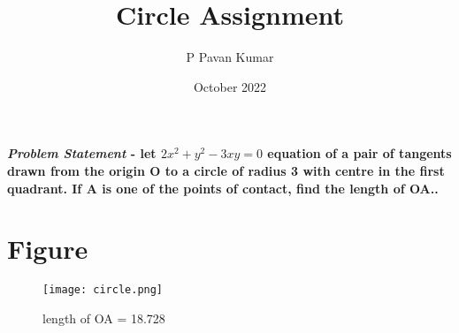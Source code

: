 \documentclass[journal,10pt,twocolumn]{article}
\title{\textbf{Circle Assignment}}
\author{P Pavan Kumar}
\date{October 2022}
\begin{document}
\maketitle
\paragraph{\textit{Problem Statement} - let $ 2x^2+y^2-3xy=0 $ equation of a pair of tangents drawn from the origin O to a circle of radius 3 with centre in the first quadrant. If A is one of the points of contact, find the length of OA..}

\section*{\large Figure}

\begin{figure}[H]
\centering
\texttt{[image: circle.png]}
\caption{length of OA = 18.728}
\label{fig:triangle}
\end{figure}
\end{document}
